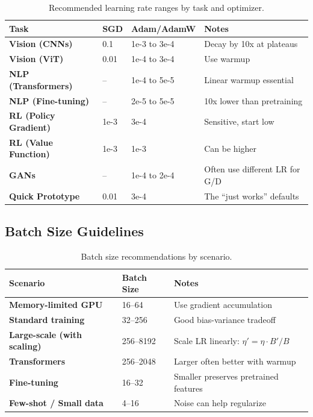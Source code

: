 \documentclass[../main.tex]{subfiles}
\begin{document}
\begin{table}[htbp]
\centering
\renewcommand{\arraystretch}{1.2}
\begin{tabular}{llll}
\toprule
\textbf{Task} & \textbf{SGD} & \textbf{Adam/AdamW} & \textbf{Notes} \\
\midrule
\textbf{Vision (CNNs)} & 0.1 & 1e-3 to 3e-4 & Decay by 10x at plateaus \\
\textbf{Vision (ViT)} & 0.01 & 1e-4 to 3e-4 & Use warmup \\
\textbf{NLP (Transformers)} & -- & 1e-4 to 5e-5 & Linear warmup essential \\
\textbf{NLP (Fine-tuning)} & -- & 2e-5 to 5e-5 & 10x lower than pretraining \\
\textbf{RL (Policy Gradient)} & 1e-3 & 3e-4 & Sensitive, start low \\
\textbf{RL (Value Function)} & 1e-3 & 1e-3 & Can be higher \\
\textbf{GANs} & -- & 1e-4 to 2e-4 & Often use different LR for G/D \\
\textbf{Quick Prototype} & 0.01 & 3e-4 & The ``just works'' defaults \\
\bottomrule
\end{tabular}
\caption{Recommended learning rate ranges by task and optimizer.}
\label{tab:lr-by-task}
\end{table}

\subsection{Batch Size Guidelines}

\begin{table}[htbp]
\centering
\renewcommand{\arraystretch}{1.2}
\begin{tabular}{lll}
\toprule
\textbf{Scenario} & \textbf{Batch Size} & \textbf{Notes} \\
\midrule
\textbf{Memory-limited GPU} & 16--64 & Use gradient accumulation \\
\textbf{Standard training} & 32--256 & Good bias-variance tradeoff \\
\textbf{Large-scale (with scaling)} & 256--8192 & Scale LR linearly: $\eta' = \eta \cdot B'/B$ \\
\textbf{Transformers} & 256--2048 & Larger often better with warmup \\
\textbf{Fine-tuning} & 16--32 & Smaller preserves pretrained features \\
\textbf{Few-shot / Small data} & 4--16 & Noise can help regularize \\
\bottomrule
\end{tabular}
\caption{Batch size recommendations by scenario.}
\label{tab:batch-size}
\end{table}
\end{document}
